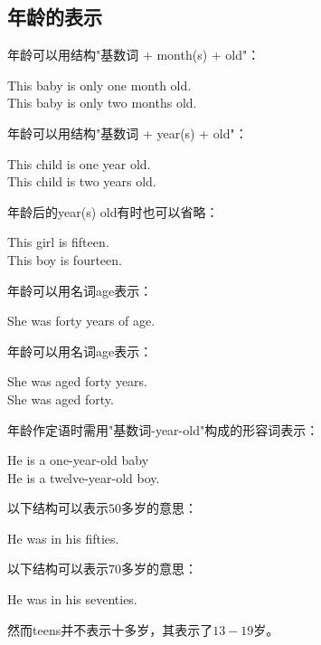 \documentclass[UTF8]{ctexart}
\newcommand{\littf}[1]{{\hspace{3pt}\ttfamily #1}}
\begin{document}
\newpage

\subsection{年龄的表示}
    年龄可以用结构\littf{"\hspace{0pt}基数词 + month(s) + old"}：
    \begin{center}
        \large\ttfamily
        This baby is only one month old.\\[3mm]
        This baby is only two months old.\\[6mm]
    \end{center}
    年龄可以用结构\littf{"\hspace{0pt}基数词 + year(s) + old"}：
    \begin{center}
        \large\ttfamily
        This child is one year old.\\[3mm]
        This child is two years old.\\[6mm]
    \end{center}
    年龄后的\littf{year(s) old}有时也可以省略：
    \begin{center}
        \large\ttfamily
        This girl is fifteen.\\[3mm]
        This boy is fourteen.\\[6mm]
    \end{center}
    年龄可以用名词\littf{age}表示：
    \begin{center}
        \large\ttfamily
        She was forty years of age.\\[6mm]
    \end{center}
    年龄可以用名词\littf{age}表示：
    \begin{center}
        \large\ttfamily
        She was aged forty years.\\[3mm]
        She was aged forty.\\[6mm]
    \end{center}
    年龄作定语时需用\littf{"\hspace{0pt}基数词-year-old"}构成的形容词表示：\
    \begin{center}
        \large\ttfamily
        He is a one-year-old baby\\[3mm]
        He is a twelve-year-old boy.\\[6mm]
    \end{center}
    以下结构可以表示$50$多岁的意思：
    \begin{center}
        \large\ttfamily
        He was in his fifties.\\[6mm]
    \end{center}
    以下结构可以表示$70$多岁的意思：
    \begin{center}
        \large\ttfamily
        He was in his seventies.\\[6mm]
    \end{center}
    然而\littf{teens}并不表示十多岁，其表示了$13-19$岁。
    
\end{document}

